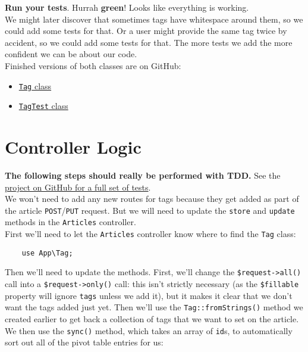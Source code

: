 \textbf{Run your tests}. Hurrah \textbf{green}! Looks like everything is working.
\\

We might later discover that sometimes tags have whitespace around them, so we could add some tests for that. Or a user might provide the same tag twice by accident, so we could add some tests for that. The more tests we add the more confident we can be about our code.
\\

Finished versions of both classes are on GitHub:

\begin{itemize}
    \item \href{https://github.com/develop-me/bootcamp--laravel-project/blob/develop/app/Tag.php}{\texttt{Tag} class}
    \item \href{https://github.com/develop-me/bootcamp--laravel-project/blob/develop/tests/Unit/TagTest.php}{\texttt{TagTest} class}
\end{itemize}


\section{Controller Logic}

\textbf{The following steps should really be performed with TDD.} See the \href{https://github.com/develop-me/bootcamp--laravel-project/tree/develop/tests/Unit}{project on GitHub for a full set of tests}.
\\

We won't need to add any new routes for tags because they get added as part of the article \texttt{POST}/\texttt{PUT} request. But we will need to update the \texttt{store} and \texttt{update} methods in the \texttt{Articles} controller.
\\

First we'll need to let the \texttt{Articles} controller know where to find the \texttt{Tag} class:

\begin{verbatim}
    use App\Tag;
\end{verbatim}

Then we'll need to update the methods. First, we'll change the \texttt{\$request->all()} call into a \texttt{\$request->only()} call: this isn't strictly necessary (as the \texttt{\$fillable} property will ignore \texttt{tags} unless we add it), but it makes it clear that we don't want the tags added just yet. Then we'll use the \texttt{Tag::fromStrings()} method we created earlier to get back a collection of tags that we want to set on the article. We then use the \texttt{sync()} method, which takes an array of \texttt{id}s, to automatically sort out all of the pivot table entries for us:


